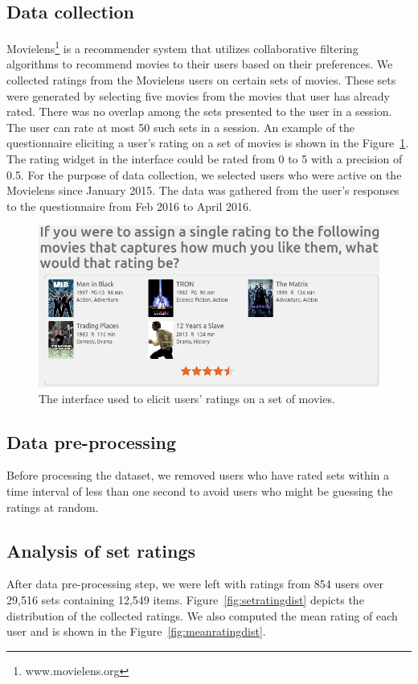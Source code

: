 

\subsection{Data collection}
Movielens\footnote{www.movielens.org} is a recommender system that utilizes collaborative filtering
algorithms to recommend movies to their users based
on their preferences.
We collected ratings from the Movielens users on certain sets of movies. These
sets were generated by selecting five movies from the movies that user has
already rated. There was no overlap among the sets presented to the user in a
session. The user can rate at most 50 such sets in a session. An example of
the questionnaire eliciting a user's rating on a set of movies is shown in the
Figure~\ref{fig:mlset}. The rating widget in the interface could be rated from 0 to 5 with a
precision of 0.5. For the purpose of data collection, we selected users who were active on the
Movielens since January 2015. The data was gathered from the user's responses to
the questionnaire from Feb 2016 to April 2016.


\begin{figure}[ht]
  \includegraphics[scale=0.30]{figures/mlset.png}
  \caption{The interface used to elicit users' ratings on a set of movies.}
  \label{fig:mlset}
\end{figure}

\subsection {Data pre-processing}
Before processing the dataset, we removed users who have rated sets within a
time interval of less than one second to avoid users who might be guessing
the ratings at random. 



\subsection{Analysis of set ratings}
After data pre-processing step, we were left with ratings
from 854 users over 29,516  sets containing 12,549 items. 
Figure~\ref{fig:setratingdist} depicts
the distribution of the collected ratings. We also computed the mean rating of
each user and is shown in the Figure~\ref{fig:meanratingdist}.  

